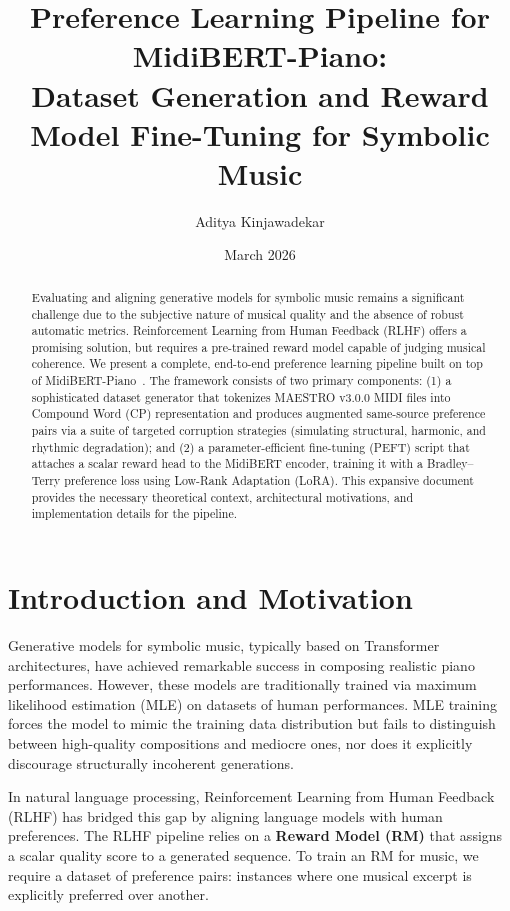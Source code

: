 \documentclass[11pt,a4paper]{article}
\title{\textbf{Preference Learning Pipeline for MidiBERT-Piano}:\\
       \large Dataset Generation and Reward Model Fine-Tuning for Symbolic Music}
\author{Aditya Kinjawadekar}
\date{March 2026}
\begin{document}
\maketitle

\begin{abstract}
Evaluating and aligning generative models for symbolic music remains a significant challenge due to the subjective nature of musical quality and the absence of robust automatic metrics. Reinforcement Learning from Human Feedback (RLHF) offers a promising solution, but requires a pre-trained reward model capable of judging musical coherence. We present a complete, end-to-end preference learning pipeline built on top of MidiBERT-Piano~\cite{midibertpiano}. The framework consists of two primary components: (1) a sophisticated dataset generator that tokenizes MAESTRO v3.0.0 MIDI files into Compound Word (CP) representation and produces augmented same-source preference pairs via a suite of targeted corruption strategies (simulating structural, harmonic, and rhythmic degradation); and (2) a parameter-efficient fine-tuning (PEFT) script that attaches a scalar reward head to the MidiBERT encoder, training it with a Bradley--Terry preference loss using Low-Rank Adaptation (LoRA). This expansive document provides the necessary theoretical context, architectural motivations, and implementation details for the pipeline.
\end{abstract}

\section{Introduction and Motivation}

Generative models for symbolic music, typically based on Transformer architectures, have achieved remarkable success in composing realistic piano performances. However, these models are traditionally trained via maximum likelihood estimation (MLE) on datasets of human performances. MLE training forces the model to mimic the training data distribution but fails to distinguish between high-quality compositions and mediocre ones, nor does it explicitly discourage structurally incoherent generations.

In natural language processing, Reinforcement Learning from Human Feedback (RLHF) has bridged this gap by aligning language models with human preferences. The RLHF pipeline relies on a \textbf{Reward Model (RM)} that assigns a scalar quality score to a generated sequence. To train an RM for music, we require a dataset of preference pairs: instances where one musical excerpt is explicitly preferred over another.
\end{document}
